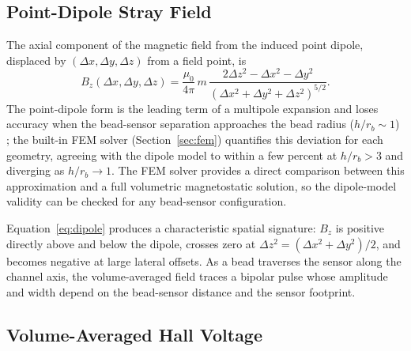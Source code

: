 \documentclass[biosensors,article,submit,pdftex,moreauthors]{Definitions/mdpi}
\begin{document}
\subsection{Point-Dipole Stray Field}
\label{sec:strayfield}

The axial component of the magnetic field from the induced point dipole, displaced
by $(\Delta x, \Delta y, \Delta z)$ from a field point, is \cite{griffiths}
\begin{equation}
B_z(\Delta x, \Delta y, \Delta z) = \frac{\mu_0}{4\pi} \, m \,
\frac{2\Delta z^2 - \Delta x^2 - \Delta y^2}
{\left(\Delta x^2 + \Delta y^2 + \Delta z^2\right)^{5/2}}.
\label{eq:dipole}
\end{equation}
The point-dipole form is the leading term of a multipole expansion and loses
accuracy when the bead-sensor separation approaches the bead radius
($h/r_b \sim 1$) \cite{griffiths}; the built-in FEM solver
(Section~\ref{sec:fem}) quantifies this deviation for each geometry, agreeing
with the dipole model to within a few percent at $h/r_b > 3$ and diverging as
$h/r_b \to 1$. The FEM solver provides a direct comparison between this
approximation and a full volumetric magnetostatic solution, so the dipole-model
validity can be checked for any bead-sensor configuration.

Equation~\eqref{eq:dipole} produces a characteristic spatial signature: $B_z$ is
positive directly above and below the dipole, crosses zero at
$\Delta z^2 = (\Delta x^2 + \Delta y^2)/2$, and becomes negative at large lateral
offsets. As a bead traverses the sensor along the channel axis, the volume-averaged
field traces a bipolar pulse whose amplitude and width depend on the bead-sensor
distance and the sensor footprint.

\subsection{Volume-Averaged Hall Voltage}
\label{sec:hallvoltage}
\end{document}
